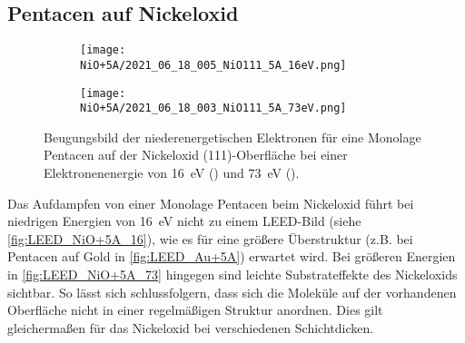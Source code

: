         \subsection{Pentacen auf Nickeloxid}
            \begin{figure}
                \centering
                \begin{subfigure}[t]{0.48\textwidth}
                    \centering
                    \texttt{[image: NiO+5A/2021\_06\_18\_005\_NiO111\_5A\_16eV.png]}
                    \subcaption{}
                    \label{fig:LEED_NiO+5A_16}
                \end{subfigure}
                \begin{subfigure}[t]{0.48\textwidth}
                    \centering
                    \texttt{[image: NiO+5A/2021\_06\_18\_003\_NiO111\_5A\_73eV.png]}
                    \subcaption{}
                    \label{fig:LEED_NiO+5A_73}
                \end{subfigure}
                \caption{Beugungsbild der niederenergetischen Elektronen für eine Monolage Pentacen auf der Nickeloxid (111)-Oberfläche bei einer Elektronenenergie von \SI{16}{\electronvolt} () und \SI{73}{\electronvolt} ().}
                \label{fig:LEED_NiO+5A}
            \end{figure}
            Das Aufdampfen von einer Monolage Pentacen beim Nickeloxid führt bei niedrigen Energien von \SI{16}{\electronvolt} nicht zu einem LEED-Bild (siehe \autoref{fig:LEED_NiO+5A_16}), wie es für eine größere Überstruktur (z.B. bei Pentacen auf Gold in \autoref{fig:LEED_Au+5A}) erwartet wird.
            Bei größeren Energien in \autoref{fig:LEED_NiO+5A_73} hingegen sind leichte Substrateffekte des Nickeloxids sichtbar.
            So lässt sich schlussfolgern, dass sich die Moleküle auf der vorhandenen Oberfläche nicht in einer regelmäßigen Struktur anordnen.
            Dies gilt gleichermaßen für das Nickeloxid bei verschiedenen Schichtdicken.


